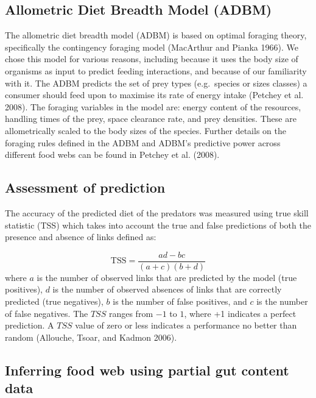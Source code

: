 \documentclass{article}
\begin{document}
\hypertarget{allometric-diet-breadth-model-adbm}{%
\subsection{Allometric Diet Breadth Model
(ADBM)}\label{allometric-diet-breadth-model-adbm}}

The allometric diet breadth model (ADBM) is based on optimal foraging
theory, specifically the contingency foraging model (MacArthur and
Pianka 1966). We chose this model for various reasons, including because
it uses the body size of organisms as input to predict feeding
interactions, and because of our familiarity with it. The ADBM predicts
the set of prey types (e.g.~species or sizes classes) a consumer should
feed upon to maximise its rate of energy intake (Petchey et al. 2008).
The foraging variables in the model are: energy content of the
resources, handling times of the prey, space clearance rate, and prey
densities. These are allometrically scaled to the body sizes of the
species. Further details on the foraging rules defined in the ADBM and
ADBM's predictive power across different food webs can be found in
Petchey et al. (2008).

\hypertarget{assessment-of-prediction}{%
\subsection{Assessment of prediction}\label{assessment-of-prediction}}

The accuracy of the predicted diet of the predators was measured using
true skill statistic (TSS) which takes into account the true and false
predictions of both the presence and absence of links defined as:

\[ \text{TSS} = \frac{ad-bc}{(a+c)(b+d)} \] where \(a\) is the number of
observed links that are predicted by the model (true positives), \(d\)
is the number of observed absences of links that are correctly predicted
(true negatives), \(b\) is the number of false positives, and \(c\) is
the number of false negatives. The \(TSS\) ranges from \(-1\) to \(1\),
where +1 indicates a perfect prediction. A \(TSS\) value of zero or less
indicates a performance no better than random (Allouche, Tsoar, and
Kadmon 2006).

\hypertarget{inferring-food-web-using-partial-gut-content-data}{%
\subsection{Inferring food web using partial gut content
data}\label{inferring-food-web-using-partial-gut-content-data}}
\end{document}

